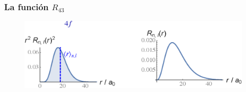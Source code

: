 \documentclass[12pt]{beamer}
\begin{document}
\begin{frame}
\frametitle{La función $R_{43}$}
\begin{figure}
   \centering
   \includegraphics[scale=0.67]{Imagenes/Plot_Funcion_Radial_43.eps}
\end{figure}
\end{frame}
    
\end{document}
